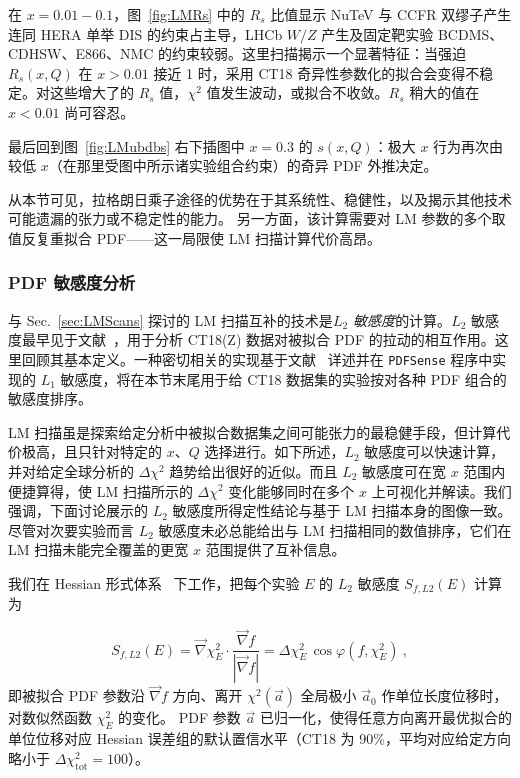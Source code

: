 在 $x=0.01\!-\!0.1$，图~\ref{fig:LMRs} 中的 $R_s$ 比值显示 NuTeV 与 CCFR 双缪子产生连同 HERA 单举 DIS 的约束占主导，LHCb $W/Z$ 产生及固定靶实验 BCDMS、CDHSW、E866、NMC 的约束较弱。这里扫描揭示一个显著特征：当强迫 $R_s(x,Q)$ 在 $x > 0.01$ 接近 1 时，采用 CT18 奇异性参数化的拟合会变得不稳定。对这些增大了的 $R_s$ 值，$\chi^2$ 值发生波动，或拟合不收敛。$R_s$ 稍大的值在 $x < 0.01$ 尚可容忍。

最后回到图~\ref{fig:LMubdbs} 右下插图中 $x=0.3$ 的 $s(x,Q)$：极大 $x$ 行为再次由较低 $x$（在那里受图中所示诸实验组合约束）的奇异 PDF 外推决定。

从本节可见，拉格朗日乘子途径的优势在于其系统性、稳健性，以及揭示其他技术可能遗漏的张力或不稳定性的能力。
另一方面，该计算需要对 LM 参数的多个取值反复重拟合 PDF——这一局限使 LM 扫描计算代价高昂。

\subsubsection{PDF 敏感度分析
\label{sec:L2}
}
与 Sec.~\ref{sec:LMScans} 探讨的 LM 扫描互补的技术是{\it $L_2$ 敏感度}的计算。$L_2$ 敏感度最早见于文献~\cite{Hobbs:2019gob}，用于分析 CT18(Z) 数据对被拟合 PDF 的拉动的相互作用。这里回顾其基本定义。一种密切相关的实现基于文献~\cite{Wang:2018heo} 详述并在 \texttt{PDFSense} 程序中实现的 $L_1$ 敏感度，将在本节末尾用于给 CT18 数据集的实验按对各种 PDF 组合的敏感度排序。

LM 扫描虽是探索给定分析中被拟合数据集之间可能张力的最稳健手段，但计算代价极高，且只针对特定的 $x$、$Q$ 选择进行。如下所述，$L_2$ 敏感度可以快速计算，并对给定全球分析的 $\Delta \chi^2$ 趋势给出很好的近似。而且 $L_2$ 敏感度可在宽 $x$ 范围内便捷算得，使 LM 扫描所示的 $\Delta \chi^2$ 变化能够同时在多个 $x$ 上可视化并解读。我们强调，下面讨论展示的 $L_2$ 敏感度所得定性结论与基于 LM 扫描本身的图像一致。
尽管对次要实验而言 $L_2$ 敏感度未必总能给出与 LM 扫描相同的数值排序，它们在 LM 扫描未能完全覆盖的更宽 $x$ 范围提供了互补信息。


我们在 Hessian 形式体系~\cite{Pumplin:2002vw,Nadolsky:2008zw,Pumplin:2001ct} 下工作，把每个实验 $E$ 的 $L_2$ 敏感度 $S_{f, L2}(E)$ 计算为

\begin{equation}
S_{f, L2}(E) = \vec{\nabla} \chi^2_E \cdot \frac{ \vec{\nabla} f } { |\vec{\nabla} f| }
             = \Delta \chi^2_E\, \cos \varphi (f, \chi^2_E)\ ,
\label{eq:L2}
\end{equation}
即被拟合 PDF 参数沿 $\vec{\nabla}f$ 方向、离开 $\chi^2(\vec{a})$ 全局极小 $\vec{a}_0$ 作单位长度位移时，对数似然函数 $\chi^2_E$ 的变化。
PDF 参数 $\vec a$ 已归一化，使得任意方向离开最优拟合的单位位移对应 Hessian 误差组的默认置信水平（CT18 为 90\%，平均对应给定方向略小于 $\Delta\chi^2_{\textrm{tot}}=100$）。

